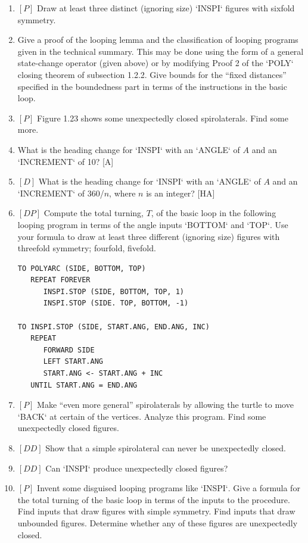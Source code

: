 \documentclass{book}
\begin{document}
\begin{enumerate}
\item $[P]$ Draw at least three distinct (ignoring size) \textsc{`INSPI`} figures with
sixfold symmetry.
\item Give a proof of the looping lemma and the classification of looping
programs given in the technical summary. This may be done using the
form of a general state-change operator (given above) or by modifying
Proof 2 of the \textsc{`POLY`} closing theorem of subsection 1.2.2. Give bounds
for the ``fixed distances'' specified in the boundedness part in terms of
the instructions in the basic loop.
\item $[P]$ Figure 1.23 shows some unexpectedly closed spirolaterals. Find
some more.
\item What is the heading change for \textsc{`INSPI`} with an \textsc{`ANGLE`} of $A$ and an
\textsc{`INCREMENT`} of 10? [A]
\item $[D]$ What is the heading change for \textsc{`INSPI`} with an \textsc{`ANGLE`} of $A$ and
an \textsc{`INCREMENT`} of 360/$n$, where $n$ is an integer? [HA]
\item $[DP]$ Compute the total turning, $T$, of the basic loop in the following
looping program in terms of the angle inputs \textsc{`BOTTOM`} and \textsc{`TOP`}. Use
your formula to draw at least three different (ignoring size) figures with
threefold symmetry; fourfold, fivefold.  

\begin{verbatim}
TO POLYARC (SIDE, BOTTOM, TOP)
   REPEAT FOREVER
      INSPI.STOP (SIDE, BOTTOM, TOP, 1)
      INSPI.STOP (SIDE. TOP, BOTTOM, -1)

TO INSPI.STOP (SIDE, START.ANG, END.ANG, INC)
   REPEAT
      FORWARD SIDE
      LEFT START.ANG
      START.ANG <- START.ANG + INC
   UNTIL START.ANG = END.ANG
\end{verbatim}
\item $[P]$ Make ``even more general'' spirolaterals by allowing the turtle to
move \textsc{`BACK`} at certain of the vertices. Analyze this program. Find some
unexpectedly closed figures.
\item $[DD]$ Show that a simple spirolateral can never be unexpectedly
closed.  
\item $[DD]$ Can \textsc{`INSPI`} produce unexpectedly closed figures?
\item $[P]$ Invent some disguised looping programs like \textsc{`INSPI`}. Give a
formula for the total turning of the basic loop in terms of the inputs
to the procedure. Find inputs that draw figures with simple symmetry.
Find inputs that draw unbounded figures. Determine whether any of
these figures are unexpectedly closed.


\end{enumerate}
\end{document}
